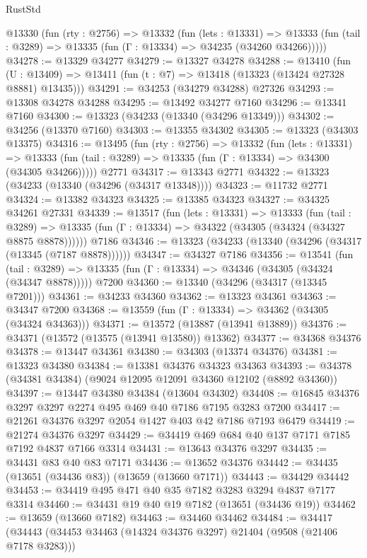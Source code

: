\begin{lexlean}{RustStd}
\begin{coremodule}
  @13330
    (fun (rty : @2756) =>
    @13332
      (fun (lets : @13331) =>
      @13333 (fun (tail : @3289) => @13335 (fun (Γ : @13334) => @34235 (@34260 @34266)))))
@34278 := @13329 @34277
@34279 := @13327 @34278
@34288 := @13410
    (fun (U : @13409) => @13411 (fun (t : @7) => @13418 (@13323 (@13424 @27328 @8881) @13435)))
@34291 := @34253 (@34279 @34288) @27326
@34293 := @13308 @34278 @34288
@34295 := @13492 @34277 @7160
@34296 := @13341 @7160
@34300 := @13323 (@34233 (@13340 (@34296 @13349)))
@34302 := @34256 (@13370 @7160)
@34303 := @13355 @34302
@34305 := @13323 (@34303 @13375)
@34316 := @13495
    (fun (rty : @2756) =>
    @13332
      (fun (lets : @13331) =>
      @13333 (fun (tail : @3289) => @13335 (fun (Γ : @13334) => @34300 (@34305 @34266)))))
    @2771
@34317 := @13343 @2771
@34322 := @13323 (@34233 (@13340 (@34296 (@34317 @13348))))
@34323 := @11732 @2771
@34324 := @13382 @34323
@34325 := @13385 @34323
@34327 := @34325 @34261 @27331
@34339 := @13517
    (fun (lets : @13331) =>
    @13333
      (fun (tail : @3289) =>
      @13335 (fun (Γ : @13334) => @34322 (@34305 (@34324 (@34327 @8875 @8878))))))
    @7186
@34346 := @13323 (@34233 (@13340 (@34296 (@34317 (@13345 (@7187 @8878))))))
@34347 := @34327 @7186
@34356 := @13541
    (fun (tail : @3289) => @13335 (fun (Γ : @13334) => @34346 (@34305 (@34324 (@34347 @8878)))))
    @7200
@34360 := @13340 (@34296 (@34317 (@13345 @7201)))
@34361 := @34233 @34360
@34362 := @13323 @34361
@34363 := @34347 @7200
@34368 := @13559 (fun (Γ : @13334) => @34362 (@34305 (@34324 @34363)))
@34371 := @13572 (@13887 (@13941 @13889))
@34376 := @34371 (@13572 (@13575 (@13941 @13580)) @13362)
@34377 := @34368 @34376
@34378 := @13447 @34361
@34380 := @34303 (@13374 @34376)
@34381 := @13323 @34380
@34384 := @13381 @34376 @34323 @34363
@34393 := @34378 (@34381 @34384) (@9024 @12095 @12091 @34360 @12102 (@8892 @34360))
@34397 := @13447 @34380 @34384 (@13604 @34302)
@34408 := @16845 @34376 @3297 @3297 @2274 @495 @469 @40 @7186 @7195 @3283 @7200
@34417 := @21261 @34376 @3297 @2054 @1427 @403 @42 @7186 @7193 @6479
@34419 := @21274 @34376 @3297
@34429 := @34419 @469 @684 @40 @137 @7171 @7185 @7192 @4837 @7166 @3314
@34431 := @13643 @34376 @3297
@34435 := @34431 @83 @40 @83 @7171
@34436 := @13652 @34376
@34442 := @34435 (@13651 (@34436 @83)) (@13659 (@13660 @7171))
@34443 := @34429 @34442
@34453 := @34419 @495 @471 @40 @35 @7182 @3283 @3294 @4837 @7177 @3314
@34460 := @34431 @19 @40 @19 @7182 (@13651 (@34436 @19))
@34462 := @13659 (@13660 @7182)
@34463 := @34460 @34462
@34484 := @34417
    (@34443
      (@34453 @34463 (@14324 @34376 @3297) @21404 (@9508 (@21406 @7178 @3283)))

\end{coremodule}
\end{lexlean}
